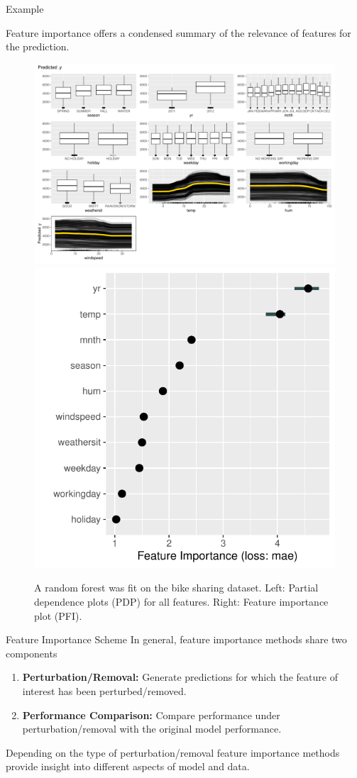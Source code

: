 \documentclass[11pt,compress,t,notes=noshow, xcolor=table]{beamer}
\begin{document}
\begin{vbframe}{Example}

Feature importance offers a condensed summary of the relevance of features for the prediction.

\begin{center}
  \begin{figure}
  \includegraphics[width=0.6\linewidth]{figure_man/bike_pdp+ice} \hfill \includegraphics[width=0.35\linewidth]{figure_man/bike_pfi}
  \caption{A random forest was fit on the bike sharing dataset. Left: Partial dependence plots (PDP) for all features. Right: Feature importance plot (PFI).}
\end{figure}
\end{center}

\end{vbframe}

\begin{vbframe}{Feature Importance Scheme}
In general, feature importance methods share two components
\lz
\begin{enumerate}
  \item \textbf{Perturbation/Removal:} Generate predictions for which the feature of interest has been perturbed/removed.
  \item \textbf{Performance Comparison:} Compare performance under perturbation/removal with the original model performance.
\end{enumerate}
\lz
Depending on the type of perturbation/removal feature importance methods provide insight into different aspects of model and data.
\end{vbframe}
\end{document}
